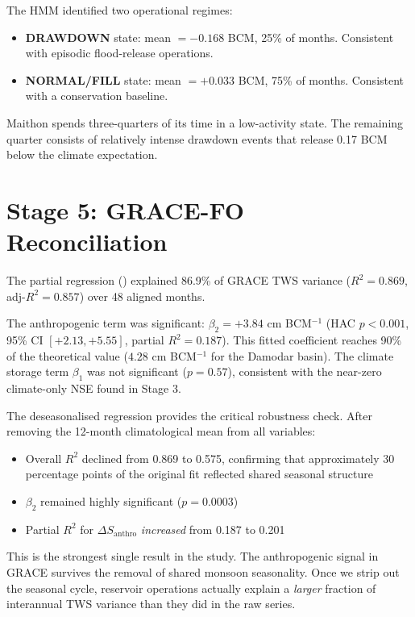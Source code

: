 \documentclass[12pt,a4paper,oneside]{report}
\newcommand{\dSanthro}{\Delta S_{\mathrm{anthro}}}
\begin{document}
The HMM identified two operational regimes:
\begin{itemize}[leftmargin=*]
  \item \textbf{DRAWDOWN} state: mean $= -0.168$ BCM, 25\% of months.
    Consistent with episodic flood-release operations.
  \item \textbf{NORMAL/FILL} state: mean $= +0.033$ BCM, 75\% of months.
    Consistent with a conservation baseline.
\end{itemize}

Maithon spends three-quarters of its time in a low-activity state. The
remaining quarter consists of relatively intense drawdown events that release
0.17 BCM below the climate expectation.

\section{Stage 5: GRACE-FO Reconciliation}

The partial regression () explained 86.9\% of GRACE TWS
variance ($R^2 = 0.869$, adj-$R^2 = 0.857$) over 48 aligned months.

The anthropogenic term was significant: $\beta_2 = +3.84$ cm BCM$^{-1}$
(HAC $p < 0.001$, 95\% CI $[+2.13, +5.55]$, partial $R^2 = 0.187$). This
fitted coefficient reaches 90\% of the theoretical value ($4.28$ cm
BCM$^{-1}$ for the Damodar basin). The climate storage term $\beta_1$ was
not significant ($p = 0.57$), consistent with the near-zero climate-only NSE
found in Stage 3.

The deseasonalised regression provides the critical robustness check. After
removing the 12-month climatological mean from all variables:
\begin{itemize}[leftmargin=*]
  \item Overall $R^2$ declined from 0.869 to 0.575, confirming that
    approximately 30 percentage points of the original fit reflected shared
    seasonal structure
  \item $\beta_2$ remained highly significant ($p = 0.0003$)
  \item Partial $R^2$ for $\dSanthro$ \textit{increased} from 0.187 to 0.201
\end{itemize}

This is the strongest single result in the study. The anthropogenic signal in
GRACE survives the removal of shared monsoon seasonality. Once we strip out
the seasonal cycle, reservoir operations actually explain a \textit{larger}
fraction of interannual TWS variance than they did in the raw series.
\end{document}
